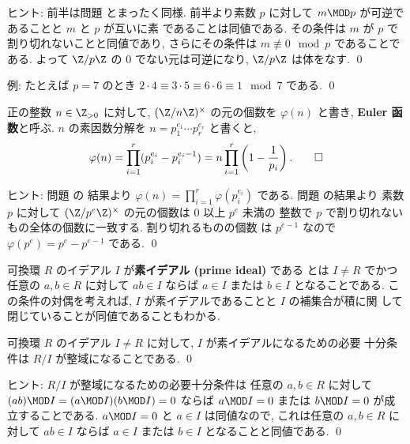 \documentclass[12pt,twoside]{jarticle}
\begin{document}
\noindent
ヒント: 前半は問題  とまったく同様.
前半より素数 $p$ に対して $m\MOD p$ が可逆であることと $m$ と $p$ が互いに素
であることは同値である. その条件は $m$ が $p$ で割り切れないことと同値であり, 
さらにその条件は $m\not\equiv 0\mod p$ であることである.  
よって $\Z/p\Z$ の $0$ でない元は可逆になり, $\Z/p\Z$ は体をなす.
\qed

\medskip
\noindent
例: たとえば $p=7$ のとき $2\cdot4\equiv 3\cdot5\equiv6\cdot6\equiv1\mod7$
である. 
\qed


\begin{question}[Euler 函数]
\label{q:Euler-function}
  正の整数 $n\in\Z_{>0}$ に対して, 
  $(\Z/n\Z)^\times$ の元の個数を $\varphi(n)$ と書き,
  {\bf Euler 函数}と呼ぶ.
  $n$ の素因数分解を $n=p_1^{e_1}\cdots p_r^{e_r}$ と書くと,
  \begin{equation*}
    \varphi(n) 
    = \prod_{i=1}^r (p_i^{e_i} - p_i^{e_i-1})
    = n \prod_{i=1}^r\left(1 - \frac{1}{p_i}\right).
    \qed
  \end{equation*}
\end{question}

\noindent
ヒント: 問題  の
結果より $\varphi(n)=\prod_{i=1}^r\varphi(p_i^{e_i})$ である.
問題  の結果より
素数 $p$ に対して $(\Z/p^e\Z)^\times$ の元の個数は $0$ 以上 $p^e$ 未満の
整数で $p$ で割り切れないもの全体の個数に一致する. 割り切れるものの個数
は $p^{e-1}$ なので $\varphi(p^e)=p^e-p^{e-1}$ である.
\qed

\bigskip

可換環 $R$ のイデアル $I$ が{\bf 素イデアル (prime ideal)} である
とは $I\ne R$ でかつ任意の $a,b\in R$ に対して $ab\in I$ ならば $a\in I$ 
または $b\in I$ となることである.
この条件の対偶を考えれば, $I$ が素イデアルであることと $I$ の補集合が積に関
して閉じていることが同値であることもわかる.

\begin{question}[それで割って整域になるのが素イデアル]
\label{q:prime-ideal-integral-domain}
  可換環 $R$ のイデアル $I\ne R$ に対して, $I$ が素イデアルになるための必要
  十分条件は $R/I$ が整域になることである. 
  \qed
\end{question}

\noindent
ヒント: $R/I$ が整域になるための必要十分条件は
任意の $a,b\in R$ に対して $(ab)\MOD I=(a\MOD I)(b\MOD I)=0$ 
ならば $a\MOD I=0$ または $b\MOD I=0$ が成立することである. 
$a\MOD I=0$ と $a\in I$ は同値なので, 
これは任意の $a,b\in R$ に対して $ab\in I$ ならば $a\in I$ 
または $b\in I$ となることと同値である.
\qed
\end{document}
